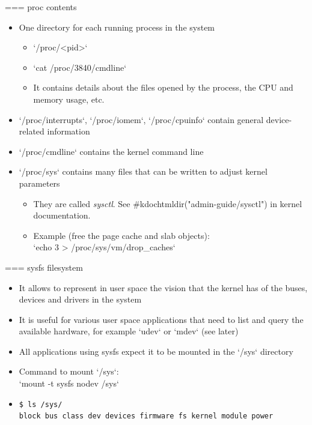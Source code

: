 === proc contents
  \begin{itemize}
  \item One directory for each running process in the system
    \begin{itemize}
    \item `/proc/<pid>`
    \item `cat /proc/3840/cmdline`
    \item It contains details about the files opened by the process,
      the CPU and memory usage, etc.
    \end{itemize}
  \item `/proc/interrupts`, `/proc/iomem`,
    `/proc/cpuinfo` contain general device-related information
  \item `/proc/cmdline` contains the kernel command line
  \item `/proc/sys` contains many files that can be written to
    adjust kernel parameters
    \begin{itemize}
    \item They are called {\em sysctl}. See #kdochtmldir("admin-guide/sysctl")
      in kernel documentation.
    \item Example (free the page cache and slab objects):\\
      `echo 3 > /proc/sys/vm/drop_caches`
    \end{itemize}
  \end{itemize}


=== sysfs filesystem
  \begin{itemize}
  \item It allows to represent in user space the vision that the kernel
    has of the buses, devices and drivers in the system
  \item It is useful for various user space applications that need to
    list and query the available hardware, for example `udev` or
    `mdev` (see later)
  \item All applications using sysfs expect it to be mounted in the
    `/sys` directory
  \item Command to mount `/sys`:\\
    `mount -t sysfs nodev /sys`
  \item
\begin{verbatim}
$ ls /sys/
block bus class dev devices firmware fs kernel module power
\end{verbatim}
  \end{itemize}

